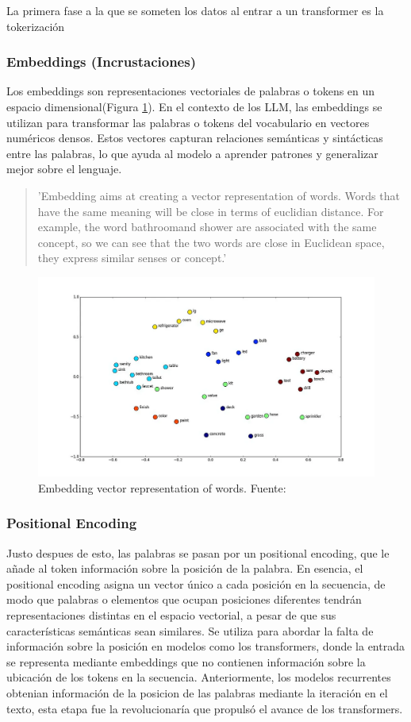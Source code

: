  La primera fase a la que se someten los datos al entrar a un transformer es la tokerización

 \subsubsection{Embeddings (Incrustaciones)}
   Los embeddings son representaciones vectoriales de palabras o tokens en un espacio dimensional(Figura \ref{fig:embedding}). En el contexto de los LLM, las embeddings se utilizan para transformar las palabras o tokens del vocabulario en vectores numéricos densos. Estos vectores capturan relaciones semánticas y sintácticas entre las palabras, lo que ayuda al modelo a aprender patrones y generalizar mejor sobre el lenguaje.

\begin{quote}
'Embedding aims at creating a vector representation of words. Words that have the same meaning will be close in terms of euclidian distance. For example, the word bathroomand shower are associated with the same concept, so we can see that the two words are close in Euclidean space, they express similar senses or concept.'\cite{atention-blog}

\end{quote}
   
   \begin{figure}[H]
        \centering
        \includegraphics[width=.45\textwidth]{plantilla-libro/img/espacio_vectorial_encoding.png}
        \caption{Embedding vector representation of words. Fuente: \cite{atention-blog}}
        \label{fig:embedding}
    \end{figure}

 \newpage
 \subsubsection{Positional Encoding}
 Justo despues de esto, las palabras se pasan por un positional encoding, que le añade al token información sobre la posición de la palabra.
    En esencia, el positional encoding asigna un vector único a cada posición en la secuencia, de modo que palabras o elementos que ocupan posiciones diferentes tendrán representaciones distintas en el espacio vectorial, a pesar de que sus características semánticas sean similares.
    Se utiliza para abordar la falta de información sobre la posición en modelos como los transformers, donde la entrada se representa mediante embeddings que no contienen información sobre la ubicación de los tokens en la secuencia. Anteriormente, los modelos recurrentes obtenian información de la posicion de las palabras mediante la iteración en el texto, esta etapa fue la revolucionaría que propulsó el avance de los transformers.
